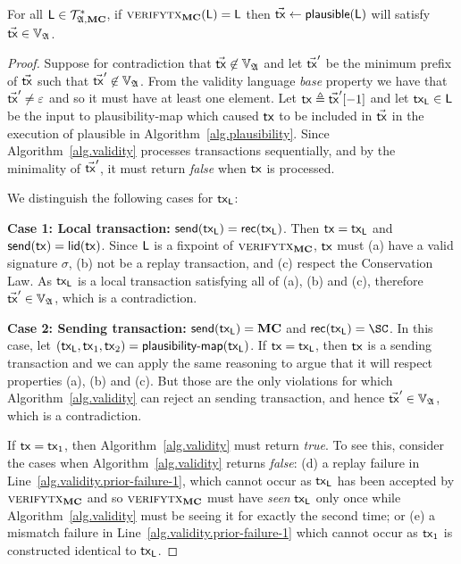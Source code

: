 \begin{lemma}[Plausibility]\label{lem:plausibility}
  For all $\mathsf{L} \in \mathcal{T}_{\mathfrak{A},\mathbf{MC}}^*$, if $\textsc{verifytx}_{\mathbf{MC}}(\mathsf{L}) =
  \mathsf{L}$ then $\vec{\mathsf{tx}} \gets \textsf{plausible}(\mathsf{L})$ will satisfy $\vec{\mathsf{tx}} \in
  \mathbb{V}_{\mathfrak{A}}$.
\end{lemma}
\begin{proof}
  Suppose for contradiction that $\vec{\mathsf{tx}} \not\in
  \mathbb{V}_{\mathfrak{A}}$ and let $\vec{\mathsf{tx}}'$ be the minimum prefix of $\vec{\mathsf{tx}}$ such
  that $\vec{\mathsf{tx}}' \not \in \mathbb{V}_{\mathfrak{A}}$. From the validity language
  \emph{base} property we have that $\vec{\mathsf{tx}}' \neq \varepsilon$ and so it must have at
  least one element. Let $\mathsf{tx} \triangleq \vec{\mathsf{tx}}'[-1]$ and let $\mathsf{tx}_{\mathsf{L}} \in \mathsf{L}$ be the input
  to \textsf{plausibility-map} which caused $\mathsf{tx}$ to be included in $\vec{\mathsf{tx}}$ in
  the execution of \textsf{plausible} in Algorithm~\ref{alg.plausibility}.
  Since Algorithm~\ref{alg.validity} processes transactions sequentially, and
  by the minimality of $\vec{\mathsf{tx}}'$, it must return \emph{false} when $\mathsf{tx}$ is
  processed.

  We distinguish the following cases for $\mathsf{tx}_{\mathsf{L}}$:

  \textbf{Case 1: Local transaction:} $\mathsf{send}(\mathsf{tx}_{\mathsf{L}}) = \mathsf{rec}(\mathsf{tx}_{\mathsf{L}})$.
  Then $\mathsf{tx} = \mathsf{tx}_{\mathsf{L}}$ and $\mathsf{send}(\mathsf{tx}) = \mathsf{lid}(\mathsf{tx})$. Since
  $\mathsf{L}$ is a fixpoint of $\textsc{verifytx}_{\mathbf{MC}}$,
  $\mathsf{tx}$ must (a) have a valid signature $\sigma$, (b) not be a replay transaction,
  and (c) respect the Conservation Law. As $\mathsf{tx}_{\mathsf{L}}$ is a local
  transaction satisfying all of (a), (b) and (c), therefore
  $\vec{\mathsf{tx}}' \in \mathbb{V}_{\mathfrak{A}}$, which is a contradiction.

  \textbf{Case 2: Sending transaction:} $\mathsf{send}(\mathsf{tx}_{\mathsf{L}}) = \mathbf{MC}$ and $\rec(\tx_{\LState}) =
  \SC$. In this case, let $(\mathsf{tx}_{\mathsf{L}}, \mathsf{tx}_1, \mathsf{tx}_2) = \textsf{plausibility-map}(\mathsf{tx}_{\mathsf{L}})$.
  If $\mathsf{tx} = \mathsf{tx}_{\mathsf{L}}$,
  then $\mathsf{tx}$ is a sending transaction
  and we can apply the same
  reasoning to argue that it will respect properties (a), (b) and (c). But those
  are the only violations for which Algorithm~\ref{alg.validity} can reject an
  sending transaction, and hence $\vec{\mathsf{tx}}' \in \mathbb{V}_{\mathfrak{A}}$, which is a
  contradiction.

  If $\mathsf{tx} = \mathsf{tx}_1$, then Algorithm~\ref{alg.validity} must return \emph{true}.
  To see this, consider the cases when Algorithm~\ref{alg.validity} returns
  \emph{false}: (d) a replay failure in Line~\ref{alg.validity.prior-failure-1},
  which cannot occur as $\mathsf{tx}_{\mathsf{L}}$ has been accepted by $\textsc{verifytx}_{\mathbf{MC}}$ and
  so $\textsc{verifytx}_{\mathbf{MC}}$ must have \emph{seen} $\mathsf{tx}_{\mathsf{L}}$ only once while
  Algorithm~\ref{alg.validity} must be seeing it for exactly the second time; or
  (e) a mismatch failure in Line~\ref{alg.validity.prior-failure-1} which cannot
  occur as $\mathsf{tx}_1$ is constructed identical to $\mathsf{tx}_{\mathsf{L}}$.


\end{proof}
